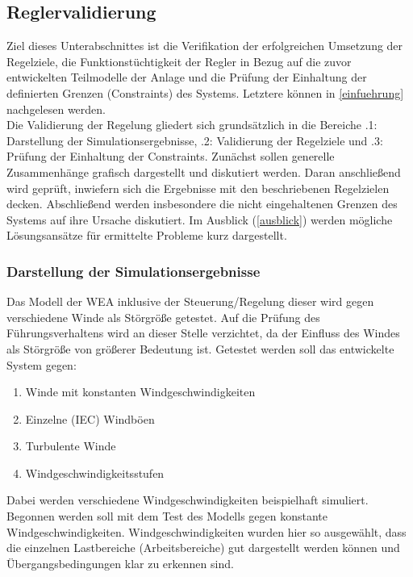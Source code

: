 \subsection{Reglervalidierung} \label{reglervalidierung}

Ziel dieses Unterabschnittes ist die Verifikation der erfolgreichen Umsetzung der Regelziele, die Funktionstüchtigkeit der Regler in Bezug auf die zuvor entwickelten Teilmodelle der Anlage und die Prüfung der Einhaltung der definierten Grenzen (Constraints) des Systems. Letztere können in \autoref{einfuehrung} nachgelesen werden. \\
Die Validierung der Regelung gliedert sich grundsätzlich in die Bereiche .1: Darstellung der Simulationsergebnisse\grqq{}, .2: Validierung der Regelziele\grqq{} und .3: Prüfung der Einhaltung der Constraints\grqq{}. Zunächst sollen generelle Zusammenhänge grafisch dargestellt und diskutiert werden. Daran anschließend wird geprüft, inwiefern sich die Ergebnisse mit den beschriebenen Regelzielen decken. Abschließend werden insbesondere die nicht eingehaltenen Grenzen des Systems auf ihre Ursache diskutiert. Im Ausblick (\autoref{ausblick}) werden mögliche Lösungsansätze für ermittelte Probleme kurz dargestellt.

\subsubsection{Darstellung der Simulationsergebnisse}

Das Modell der WEA inklusive der Steuerung/Regelung dieser wird gegen verschiedene Winde als Störgröße getestet. Auf die Prüfung des Führungsverhaltens wird an dieser Stelle verzichtet, da der Einfluss des Windes als Störgröße von größerer Bedeutung ist. Getestet werden soll das entwickelte System gegen:
\begin{enumerate}
    \item Winde mit konstanten Windgeschwindigkeiten
    \item Einzelne (IEC) Windböen
    \item Turbulente Winde
    \item Windgeschwindigkeitsstufen
\end{enumerate}

Dabei werden verschiedene Windgeschwindigkeiten beispielhaft simuliert. Begonnen werden soll mit dem Test des Modells gegen konstante Windgeschwindigkeiten. Windgeschwindigkeiten wurden hier so ausgewählt, dass die einzelnen Lastbereiche (Arbeitsbereiche) gut dargestellt werden können und Übergangsbedingungen klar zu erkennen sind.\\

